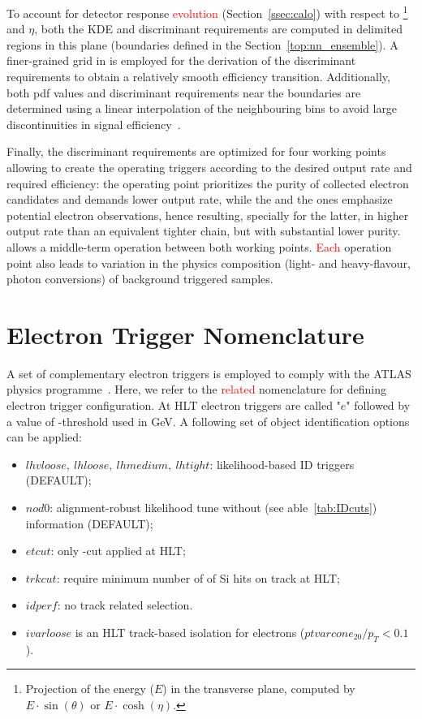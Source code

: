 To account for detector response \textcolor{red}{evolution} (Section~\ref{ssec:calo}) with
respect to \Et\footnote{Projection of the energy ($E$) in the transverse plane,
computed by $E\cdot\sin(\theta)$ or $E\cdot\cosh(\eta)$.} and
$\eta$, both the KDE and discriminant requirements are computed in delimited
regions in this plane (boundaries defined in the Section~\ref{top:nn_ensemble}).
A finer-grained grid in \Et is employed for the derivation of the discriminant
requirements to obtain a relatively smooth efficiency transition. Additionally,
both pdf values and discriminant requirements near the boundaries are determined
using a linear interpolation of the neighbouring bins to avoid large
discontinuities in signal efficiency~\cite{aaboud2019electron}.

Finally, the discriminant requirements are optimized for four working points
allowing to create the operating triggers according to the desired output rate
and required efficiency: the \tight{} operating point prioritizes the purity of
collected electron candidates and demands lower output rate, while the \loose{}
and the \vloose{} ones emphasize potential electron observations, hence
resulting, specially for the latter, in higher output rate than an equivalent
tighter chain, but with substantial lower purity.  \medium{} allows a middle-term
operation between both working points. \textcolor{red}{Each} operation point also leads to
variation in the physics composition (light- and heavy-flavour, photon
conversions) of background triggered samples.




\section{Electron Trigger Nomenclature}%
\label{ssec:menu}

A set of complementary electron triggers is employed to comply with the ATLAS
physics programme~\cite{aad2020performance}. Here, we refer to the \textcolor{red}{related} nomenclature for
defining electron trigger configuration.  At HLT electron triggers are called
"$e$" followed by a value of \et-threshold used in GeV. A following set of
object identification options can be applied:



\begin{itemize}
\item $lhvloose,~lhloose,~lhmedium,~lhtight$: likelihood-based ID triggers (DEFAULT);
\item $nod0$: alignment-robust likelihood tune without \trackdO (see able~\ref{tab:IDcuts}) information (DEFAULT);
\item $etcut$: only \et-cut applied at HLT;
\item $trkcut$: require minimum number of of Si hits on track at HLT;
\item $idperf$: no track related selection.
\item $ivarloose$ is an HLT track-based isolation for electrons ($ptvarcone_{20}/p_T<0.1$).
\end{itemize}




